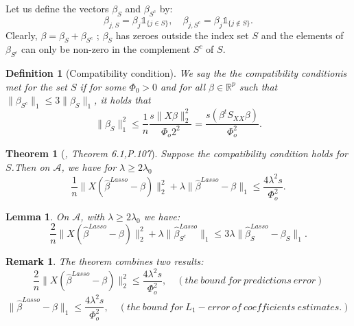 \documentclass[12pt]{report}
\newtheorem{theoreme}{Theorem}[section] %
\newtheorem {lemme}{Lemma} %
\newtheorem {definition}{Definition}[section] %
\newtheorem{remarque}{Remark}[section]
\begin{document}
Let us define  the vectors $\beta_{S}$ and $\beta_{S^{c}}$ by:
\begin{equation}
	\beta_{j,S}=\beta_{j}\mathbb{1}_{\{j\in S\}},\quad \beta_{j,S^{c}}=\beta_{j}\mathbb{1}_{\{j\notin S\}}. \label{f33}
\end{equation}
Clearly, $\beta=\beta_{S}+\beta_{S^{c}}$ ; $\beta_{S}$ has zeroes outside the index set $S$ and the elements of $\beta_{S^{c}}$ can only be non-zero in the complement $S^{c}$ of $S$.
\begin{definition}[Compatibility condition]
	We say the the compatibility conditionis met for the set $S$ if for some $\Phi_{0}>0$ and for all $\beta \in \mathbb{R}^{p}$ such that $\parallel\beta_{S^{c}}\parallel_{1}\leq 3 \parallel \beta_{S} \parallel_{1}$, it holds that 
	\begin{equation}
		\parallel \beta_{S} \parallel_{1}^{2}\leq \frac{1}{n}\frac{s\parallel X\beta \parallel_{2}^{2}}{\Phi_{o}2^{2}}=\frac{s(\beta^{t} S_{XX}\beta)}{\Phi_{o}^{2}}.
		\label{f34}
	\end{equation}
	
\end{definition}
\begin{theoreme}[\textit{\cite{nref14}, Theorem 6.1,P.107}]
	Suppose the compatibility condition holds for $S$.Then on $\mathcal{A}$, we have for $\lambda\geq 2\lambda_{0}$
	\begin{equation}
		\frac{1}{n}\parallel X(\hat{\beta}^{Lasso}-\beta )\parallel^{2}_{2}+  \lambda\parallel \hat{\beta}^{Lasso}-\beta \parallel_{1}\leq \frac{4 \lambda^{2}s}{\Phi_{o}^{2}}.
		\label{f35}
	\end{equation}
	
\end{theoreme}
\begin{lemme}
	On $\mathcal{A}$, with  $\lambda\geq 2\lambda_{0}$ we have:
	\begin{equation}
		\frac{2}{n}\parallel X(\hat{\beta}^{Lasso}-\beta )\parallel^{2}_{2}+ \lambda \parallel \hat{\beta}^{Lasso}_{S^{c}}\parallel_{1}\leq 3\lambda \parallel \hat{\beta}^{Lasso}_{S}-\beta_{S} \parallel_{1}.
		\label{f36}
	\end{equation}
\end{lemme}
\begin{remarque}
	The theorem combines two results: 
	\begin{equation}
		\frac{2}{n}\parallel X(\hat{\beta}^{Lasso}-\beta )\parallel^{2}_{2}\leq \frac{4 \lambda^{2}s}{\Phi_{o}^{2}}, \quad ( the\ bound\ for\ predictions\ error)
		\label{f37}
	\end{equation}
	\begin{equation}
		\parallel \hat{\beta}^{Lasso}-\beta \parallel_{1}\leq \frac{4 \lambda^{2}s}{\Phi_{o}^{2}}, \quad ( the\ bound\ for\ L_{1}-error\ of\ coefficients\ estimates.)
		\label{f38}
	\end{equation}
\end{remarque}
\end{document}
